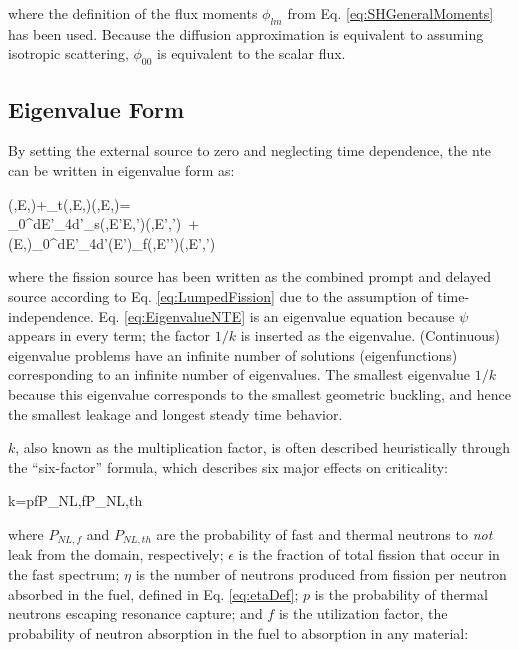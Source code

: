  where the definition of the flux moments \(\phi_{lm}\) from Eq. \eqref{eq:SHGeneralMoments} has been used. Because the diffusion approximation is equivalent to assuming isotropic scattering, \(\phi_{00}\) is equivalent to the scalar flux.
 
\subsection{Eigenvalue Form}
\label{sec:EigenvalueForm}
By setting the external source to zero and neglecting time dependence, the \gls{nte} can be written in eigenvalue form as:

\beqa
\label{eq:EigenvalueNTE}
\hO\cdot\nabla\psi(,E,\hO)+\Sigma_t(,E,\hO)\psi(,E,\hO)=\hspace{2cm}\\
\int_0^\infty dE'\int_{4\pi}d\hO'\Sigma_s(,E'\rightarrow E,\hO'\rightarrow\hO)\psi(,E',\hO')\ +\hspace{1cm}\\
\chi(E,\hO)\int_0^\infty dE'\int_{4\pi}d\hO'\nu(E')\Sigma_f(,E'\hO')\psi(,E',\hO')
\eeqa

where the fission source has been written as the combined prompt and delayed source according to Eq. \eqref{eq:LumpedFission} due to the assumption of time-independence. Eq. \eqref{eq:EigenvalueNTE} is an eigenvalue equation because \(\psi\) appears in every term; the factor \(1/k\) is inserted as the eigenvalue. (Continuous) eigenvalue problems have an infinite number of solutions (eigenfunctions) corresponding to an infinite number of eigenvalues. The smallest eigenvalue \(1/k\) because this eigenvalue corresponds to the smallest geometric buckling, and hence the smallest leakage and longest steady time behavior. 

\(k\), also known as the multiplication factor, is often described heuristically through the ``six-factor'' formula, which describes six major effects on criticality:

\beq
\label{eq:SixFactor}
k=\epsilon p\eta fP_{NL,f}P_{NL,th}
\eeq

where \(P_{NL,f}\) and \(P_{NL,th}\) are the probability of fast and thermal neutrons to {\it not} leak from the domain, respectively; \(\epsilon\) is the fraction of total fission that occur in the fast spectrum; \(\eta\) is the number of neutrons produced from fission per neutron absorbed in the fuel, defined in Eq. \eqref{eq:etaDef}; \(p\) is the probability of thermal neutrons escaping resonance capture; and \(f\) is the utilization factor, the probability of neutron absorption in the fuel to absorption in any material:

